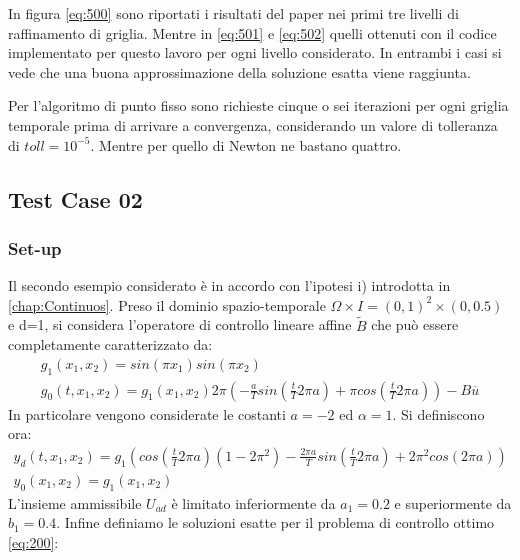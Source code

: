 In figura \ref{eq:500} sono riportati i risultati del paper \cite{MAIN} nei primi tre livelli di raffinamento di griglia. Mentre in \ref{eq:501} e \ref{eq:502} quelli ottenuti con il codice implementato per questo lavoro per ogni livello considerato. In entrambi i casi si vede che una buona approssimazione della soluzione esatta viene raggiunta.
\par
Per l'algoritmo di punto fisso sono richieste cinque o sei iterazioni per ogni griglia temporale prima di arrivare a convergenza, considerando un valore di tolleranza di $toll=10^{-5}$. Mentre per quello di Newton ne bastano quattro. 

\subsection{Test Case 02}
\subsubsection{Set-up}
Il secondo esempio considerato è in accordo con l'ipotesi i) introdotta in \ref{chap:Continuos}.
Preso il dominio spazio-temporale $\Omega \times I = (0,1)^2 \times (0,0.5)$ e d=1, si considera l'operatore di controllo lineare affine $\tilde{B}$ che può essere completamente caratterizzato da:
{\renewcommand\arraystretch{2}
\begin{equation}
\begin{array}{c}
g_1(x_1,x_2) = sin({\pi}x_1)sin({\pi}x_2)\\
g_0(t,x_1,x_2) = g_1(x_1,x_2) 2\pi \left( -\frac{a}{T}sin\left( \frac{t}{T}2{\pi}a \right) + \pi cos\left( \frac{t}{T}2{\pi}a \right) \right) - B\overline{u}
\end{array}
\label{eq:505}
\end{equation}
}
In particolare vengono considerate le costanti $a=-2$ ed $\alpha=1$.
Si definiscono ora:
{\renewcommand\arraystretch{2}
\begin{equation}
\begin{array}{c}
y_d(t,x_1,x_2) = g_1\left( cos\left( \frac{t}{T}2{\pi}a \right)(1-2{\pi}^2) -\frac{2{\pi}a}{T}sin\left( \frac{t}{T}2{\pi}a \right) +2{\pi}^2cos(2{\pi}a) \right)\\
y_0(x_1,x_2) = g_1(x_1,x_2)
\end{array}
\label{eq:506}
\end{equation}
}
L'insieme ammissibile $U_{ad}$ è limitato inferiormente da $a_1=0.2$ e superiormente da $b_1=0.4$.
Infine definiamo le soluzioni esatte per il problema di controllo ottimo \ref{eq:200}:

